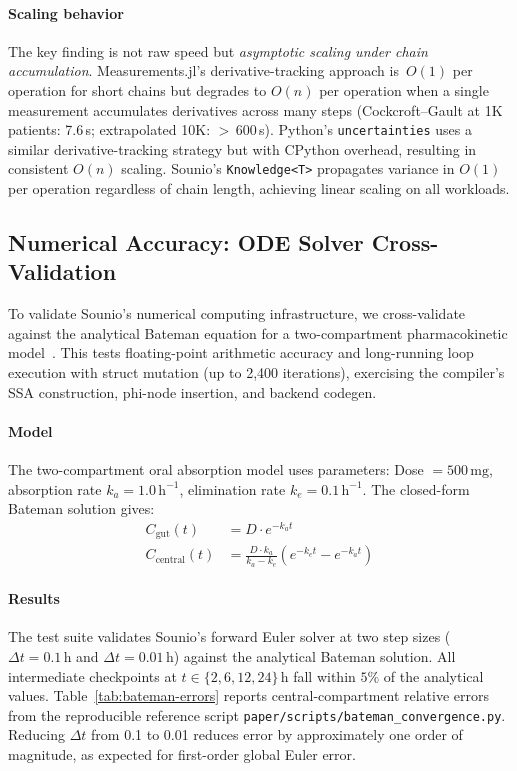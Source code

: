 \documentclass[journal]{IEEEtran}
\begin{document}
\paragraph{Scaling behavior}
The key finding is not raw speed but \emph{asymptotic scaling under
chain accumulation}. Measurements.jl's derivative-tracking approach
is~$O(1)$ per operation for short chains but degrades to $O(n)$ per
operation when a single measurement accumulates derivatives across
many steps (Cockcroft--Gault at 1K patients: 7.6\,s; extrapolated
10K: $>$\,600\,s). Python's \texttt{uncertainties} uses a similar
derivative-tracking strategy but with CPython overhead, resulting in
consistent $O(n)$ scaling. Sounio's \texttt{Knowledge<T>} propagates
variance in $O(1)$ per operation regardless of chain length,
achieving linear scaling on all workloads.

\subsection{Numerical Accuracy: ODE Solver Cross-Validation}

To validate Sounio's numerical computing infrastructure, we cross-validate
against the analytical Bateman equation for a two-compartment
pharmacokinetic model~\cite{gibaldi1982pharmacokinetics}. This tests
floating-point arithmetic accuracy and long-running loop execution with
struct mutation (up to 2,400 iterations), exercising the compiler's SSA
construction, phi-node insertion, and backend codegen.

\paragraph{Model}
The two-compartment oral absorption model uses parameters:
Dose $= 500\,\text{mg}$, absorption rate $k_a = 1.0\,\text{h}^{-1}$,
elimination rate $k_e = 0.1\,\text{h}^{-1}$.
The closed-form Bateman solution gives:
\begin{align}
  C_{\text{gut}}(t) &= D \cdot e^{-k_a t} \\
  C_{\text{central}}(t) &= \frac{D \cdot k_a}{k_a - k_e}
    \left(e^{-k_e t} - e^{-k_a t}\right)
\end{align}

\paragraph{Results}
The test suite validates Sounio's forward Euler solver at two step sizes
($\Delta t = 0.1\,\text{h}$ and $\Delta t = 0.01\,\text{h}$) against the
analytical Bateman solution. All intermediate checkpoints at
$t \in \{2, 6, 12, 24\}\,\text{h}$ fall within $5\%$ of the analytical
values. Table~\ref{tab:bateman-errors} reports central-compartment relative
errors from the reproducible reference script
\texttt{paper/scripts/bateman\_convergence.py}. Reducing $\Delta t$ from
0.1 to 0.01 reduces error by approximately one order of magnitude, as
expected for first-order global Euler error.
\end{document}
